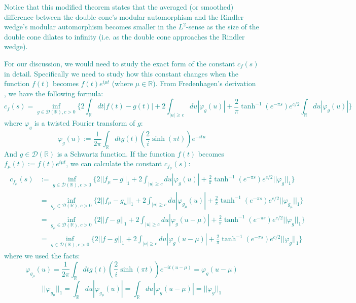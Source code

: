 \documentclass[a4paper,11pt]{article}
\theoremstyle{definition}
\newcommand{\lb}{\left(}
\newcommand{\rb}{\right)}
\newcommand{\YC}[1]{\textcolor{teal}{#1}}
\begin{document}
\YC{
Notice that this modified theorem states that the averaged (or smoothed) difference between the double cone's modular automorphism and the Rindler wedge's modular automorphism becomes smaller in the $L^2$-sense as the size of the double cone dilates to infinity (i.e. as the double cone approaches the Rindler wedge).
}

\YC{
For our discussion, we would need to study the exact form of the constant $c_f(s)$ in detail. Specifically we need to study how this constant changes when the function $f(t)$ becomes $f(t)e^{i\mu t}$ (where $\mu\in\mathbb{R}$). From Fredenhagen's derivation \cite{fredenhagen}, we have the following formula:
\begin{equation}
    c_f(s) = \inf_{g\in \mathcal{D}(\mathbb{R}), c > 0}\{2\int_\mathbb{R} dt|f(t) - g(t)| + 2\int_{|u| \geq c}du |\varphi_g(u)| + \frac{2}{\pi}\tanh^{-1}(e^{-\pi s})e^{c/2}\int_\mathbb{R} du|\varphi_g(u)|\}
\end{equation}
where $\varphi_g$ is a twisted Fourier transform of $g$:
\begin{equation}
    \varphi_g(u) := \frac{1}{2\pi}\int_\mathbb{R} dt g(t)\lb\frac{2}{i}\sinh(\pi t)\rb e^{-itu}
\end{equation}
And $g\in\mathcal{D}(\mathbb{R})$ is a Schwartz function.
}
\YC{
If the function $f(t)$ becomes $f_\mu(t) := f(t)e^{i\mu t}$, we can calculate the constant $c_{f_\mu}(s)$:
\begin{align}
    \begin{split}
        c_{f_\mu}(s) &:= \inf_{g\in\mathcal{D}(\mathbb{R}),c>0}\{2||f_\mu-g||_1 + 2\int_{|u|\geq c}du|\varphi_g(u)| + \frac{2}{\pi}\tanh^{-1}(e^{-\pi s})e^{c/2}||\varphi_g||_1\}
        \\&
        =\inf_{g_\mu\in\mathcal{D}(\mathbb{R}),c>0}\{2||f_\mu-g_\mu||_1 + 2\int_{|u|\geq c}du |\varphi_{g_\mu}(u)| + \frac{2}{\pi}\tanh^{-1}(e^{-\pi s})e^{c/2}||\varphi_{g_\mu}||_1\}
        \\&
        =\inf_{g_\mu\in\mathcal{D}(\mathbb{R}),c>0}\{2||f-g||_1 + 2\int_{|u|\geq c}du|\varphi_g(u - \mu)| + \frac{2}{\pi}\tanh^{-1}(e^{-\pi s})e^{c/2}||\varphi_g||_1\}
        \\&
        =\inf_{g\in\mathcal{D}(\mathbb{R}),c>0}\{2||f-g||_1 + 2\int_{|u|\geq c}du|\varphi_g(u - \mu)|+ \frac{2}{\pi}\tanh^{-1}(e^{-\pi s})e^{c/2}||\varphi_g||_1\}
    \end{split}
\end{align}
where we used the facts:
\begin{equation}
    \varphi_{g_\mu}(u) = \frac{1}{2\pi}\int_\mathbb{R}dt g(t)\lb\frac{2}{i}\sinh(\pi t)\rb e^{-it(u - \mu)} = \varphi_g(u - \mu)
\end{equation}
\begin{equation}
    ||\varphi_{g_\mu}||_1 = \int_\mathbb{R} du |\varphi_{g_\mu}(u)| = \int_\mathbb{R} du |\varphi_g(u - \mu)|=||\varphi_g||_1
\end{equation}
}
\end{document}
